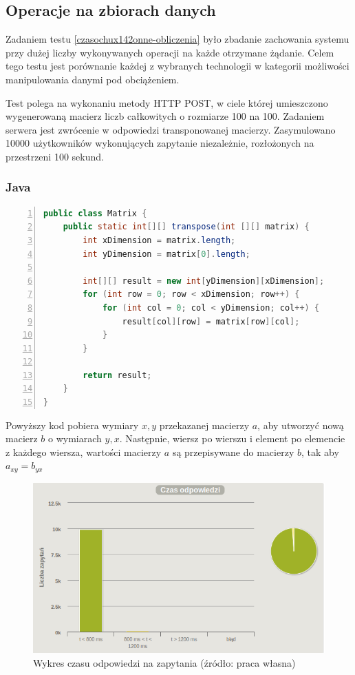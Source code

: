 \documentclass[12pt,twoside]{article}
\begin{document}
\clearpage

\subsection{Operacje na zbiorach
danych}\label{operacje-na-zbiorach-danych}

Zadaniem testu \ref{czasochux142onne-obliczenia} było zbadanie
zachowania systemu przy dużej liczby wykonywanych operacji na każde
otrzymane żądanie. Celem tego testu jest porównanie każdej z wybranych
technologii w kategorii możliwości manipulowania danymi pod obciążeniem.

Test polega na wykonaniu metody HTTP POST, w ciele której umieszczono
wygenerowaną macierz liczb całkowitych o rozmiarze 100 na 100. Zadaniem
serwera jest zwrócenie w odpowiedzi transponowanej macierzy.
Zasymulowano 10000 użytkowników wykonujących zapytanie niezależnie,
rozłożonych na przestrzeni 100 sekund.

\subsubsection{Java}\label{java-2}

\begin{lstlisting}[language=Java, numbers=left, caption=Java - transpozycja macierzy]
public class Matrix {
    public static int[][] transpose(int [][] matrix) {
        int xDimension = matrix.length;
        int yDimension = matrix[0].length;

        int[][] result = new int[yDimension][xDimension];
        for (int row = 0; row < xDimension; row++) {
            for (int col = 0; col < yDimension; col++) {
                result[col][row] = matrix[row][col];
            }
        }

        return result;
    }
}
\end{lstlisting}

Powyższy kod pobiera wymiary \(x, y\) przekazanej macierzy \(a\), aby
utworzyć nową macierz \(b\) o wymiarach \(y, x\). Następnie, wiersz po
wierszu i element po elemencie z każdego wiersza, wartości macierzy
\(a\) są przepisywane do macierzy \(b\), tak aby \(a_{xy} = b_{yx}\)

\begin{figure}[htbp]
\centering
\includegraphics[resolution=150]{test_results/java/matrix/screenshots/response_times.png}
\caption{Wykres czasu odpowiedzi na zapytania (źródło: praca własna)}
\end{figure}
\end{document}
